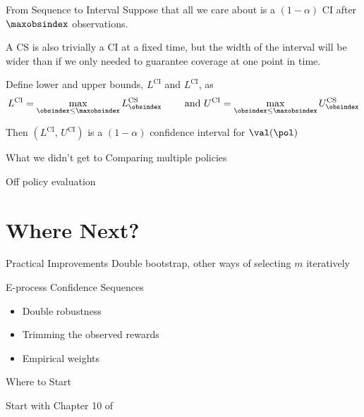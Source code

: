 \documentclass[aspectratio=169, professionalfonts]{beamer}
\begin{document}
\begin{frame}{From Sequence to Interval}
	Suppose that all we care about is a $(1 - \alpha)$ CI after $\maxobsindex$
	observations.

	\vfill
	A CS is also trivially a CI at a fixed time, but the width of the interval
	will be wider than if we only needed to guarantee coverage at one point in
	time.

	\vfill \pause

	\begin{lemma} Define lower and upper bounds, $L^{\text{CI}}$ and
		$L^{\text{CI}}$, as
		$$L^{\text{CI}} = \max_{\obsindex \leq \maxobsindex}
			L_{\obsindex}^{\text{CS}} \qquad \text{ and } U^{\text{CI}} = \max_{\obsindex \leq
				\maxobsindex} U_{\obsindex}^{\text{CS}}$$

		Then $(L^{\text{CI}},\, U^{\text{CI}})$ is a $(1 - \alpha)$ confidence
		interval for $\val(\pol)$
	\end{lemma}
\end{frame}

\begin{frame}{What we didn't get to}
	Comparing multiple policies

	Off policy evaluation
\end{frame}
\section{Where Next?}

\begin{frame}{Practical Improvements}
	Double bootstrap, other ways of selecting $m$ iteratively

	\vfill \pause

	E-process Confidence Sequences
	\begin{itemize}
		\item Double robustness
		\item Trimming the observed rewards
		\item Empirical weights
	\end{itemize}
\end{frame}


\begin{frame}{Where to Start}
	\vfill

	Start with Chapter 10 of \cite{tsiatis2019Dynamic}
	\vfill

\end{frame}
\end{document}
